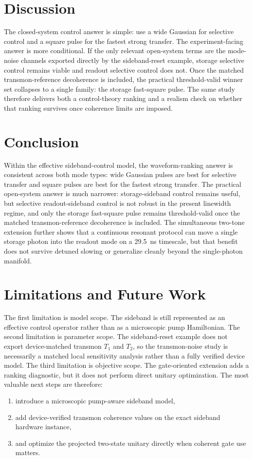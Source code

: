 \documentclass[11pt]{article}
\begin{document}
\section{Discussion}
The closed-system control answer is simple: use a wide Gaussian for selective control and a square pulse for the fastest strong transfer. The experiment-facing answer is more conditional. If the only relevant open-system terms are the mode-noise channels exported directly by the sideband-reset example, storage selective control remains viable and readout selective control does not. Once the matched transmon-reference decoherence is included, the practical threshold-valid winner set collapses to a single family: the storage fast-square pulse. The same study therefore delivers both a control-theory ranking and a realism check on whether that ranking survives once coherence limits are imposed.

\section{Conclusion}
Within the effective sideband-control model, the waveform-ranking answer is consistent across both mode types: wide Gaussian pulses are best for selective transfer and square pulses are best for the fastest strong transfer. The practical open-system answer is much narrower: storage-sideband control remains useful, but selective readout-sideband control is not robust in the present linewidth regime, and only the storage fast-square pulse remains threshold-valid once the matched transmon-reference decoherence is included. The simultaneous two-tone extension further shows that a continuous resonant protocol can move a single storage photon into the readout mode on a \SI{29.5}{ns} timescale, but that benefit does not survive detuned slowing or generalize cleanly beyond the single-photon manifold.

\section{Limitations and Future Work}
The first limitation is model scope. The sideband is still represented as an effective control operator rather than as a microscopic pump Hamiltonian. The second limitation is parameter scope. The sideband-reset example does not export device-matched transmon \(T_1\) and \(T_2\), so the transmon-noise study is necessarily a matched local sensitivity analysis rather than a fully verified device model. The third limitation is objective scope. The gate-oriented extension adds a ranking diagnostic, but it does not perform direct unitary optimization. The most valuable next steps are therefore:
\begin{enumerate}
  \item introduce a microscopic pump-aware sideband model,
  \item add device-verified transmon coherence values on the exact sideband hardware instance,
  \item and optimize the projected two-state unitary directly when coherent gate use matters.
\end{enumerate}
\end{document}
